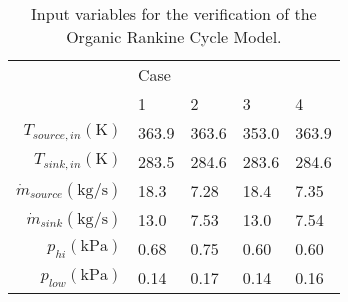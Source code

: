 \begin{table}[h]
	\centering
	\caption{Input variables for the verification of the Organic Rankine Cycle Model.}
	\label{tab:verification_ORC_vars}
	\begin{tabular}{rllll}
		\toprule
		                                              &  Case &       &       &       \\ \cline{2-5}
		                                              &     1 &     2 &     3 &     4 \\ \midrule
		$T_{source,in}(\si{\kelvin})$                 & 363.9 & 363.6 & 353.0 & 363.9 \\
		$T_{sink,in}(\si{\kelvin})$                   & 283.5 & 284.6 & 283.6 & 284.6 \\
		$\dot{m}_{source}(\si{\kilogram\per\second})$ &  18.3 &  7.28 &  18.4 &  7.35 \\
		$\dot{m}_{sink}(\si{\kilogram\per\second})$   &  13.0 &  7.53 &  13.0 &  7.54 \\
		$p_{hi}(\si{\kilo\pascal})  $                 &  0.68 &  0.75 &  0.60 &  0.60 \\
		$p_{low}(\si{\kilo\pascal}) $                 &  0.14 &  0.17 &  0.14 &  0.16 \\
		\bottomrule
	\end{tabular}
\end{table}

